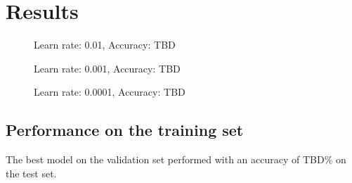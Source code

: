 \documentclass[12pt, a4paper]{scrartcl}
\begin{document}
\section{Results}
\begin{figure}[!htbp]
  \centering
  \caption{Learn rate: 0.01, Accuracy: TBD}
  \label{fig:lr_0.01}
\end{figure}

\begin{figure}[!htbp]
  \centering
  \caption{Learn rate: 0.001, Accuracy: TBD}
  \label{fig:lr_0.001}
\end{figure}

\begin{figure}[!htbp]
  \centering
  \caption{Learn rate: 0.0001, Accuracy: TBD}
  \label{fig:lr_0.001}
\end{figure}

\subsection{Performance on the training set}
The best model on the validation set performed with an accuracy of TBD\% on the
test set.
\end{document}
